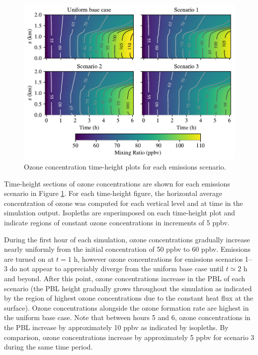 \begin{figure}[t]
  \centering
    \includegraphics[width=\textwidth]{figures/chapter4/height-time-o3-four-scenarios.pdf}
    \caption{Ozone concentration time-height plots for each emissions scenario.}
    \label{fig:ht-o3}
\end{figure}

Time-height sections of ozone concentrations are shown for each emissions scenario in Figure \ref{fig:ht-o3}. For each time-height figure, the horizontal average concentration of ozone was computed for each vertical level and at time in the simulation output. Isopleths are superimposed on each time-height plot and indicate regions of constant ozone concentrations in increments of 5 ppbv. 

During the first hour of each simulation, ozone concentrations gradually increase nearly uniformly from the initial concentration of 50 ppbv to 60 ppbv. Emissions are turned on at $t=1$ h, however ozone concentrations for emissions scenarios 1--3 do not appear to appreciably diverge from the uniform base case until $t\simeq2$ h and beyond. After this point, ozone concentrations increase in the PBL of each scenario (the PBL height gradually grows throughout the simulation as indicated by the region of highest ozone concentrations due to the constant heat flux at the surface). Ozone concentrations alongside the ozone formation rate are highest in the uniform base case. Note that between hours 5 and 6, ozone concentrations in the PBL increase by approximately 10 ppbv as indicated by isopleths. By comparison, ozone concentrations increase by approximately 5 ppbv for scenario 3 during the same time period.

